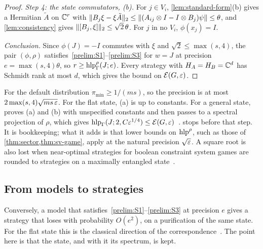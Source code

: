 \begin{proof}
\emph{Step 4: the state commutators, (b).} For $j\in V_i$, \cref{lem:standard-form}(b) gives a Hermitian $\tilde A$ on $\mathbb C^r$ with
$\lVert B_j\xi-\xi\tilde A\rVert_2\le\lVert (A_{ij}\otimes I-I\otimes B_j)\psi\rVert\le\theta$, and \cref{lem:consistency} gives
$\lVert [B_j,\xi]\rVert_2\le\sqrt2\,\theta$. For $j$ in no $V_i$, $\phi(x_j)=I$.

\emph{Conclusion.} Since $\phi(J)=-I$ commutes with $\xi$ and $\sqrt2\le\max(s,4)$, the pair $(\phi,\rho)$ satisfies~\ref{prelim:S1}--\ref{prelim:S3}
for $w=J$ at precision $e=\max(s,4)\theta$, so $r\ge\operatorname{hlp}^{\rho}_\Gamma(J;e)$. Every strategy with $H_A=H_B=\mathbb C^d$ has Schmidt rank at most $d$,
which gives the bound on $\mathcal E(G,\varepsilon)$.
\end{proof}

\begin{remark}[Credits]\label{transfer:credits}
For the default distribution $\pi_{\min}\ge1/(ms)$, so the precision is at most $2\max(s,4)\sqrt{ms\,\varepsilon}$. For the flat state, (a) is
\cite[Proposition~4.4(b)]{SV18} up to constants. For a general state, \cite[Proposition~5.4]{SV18} proves (a) and (b) with unspecified
constants and then passes to a spectral projection of $\rho$, which gives $\operatorname{hlp}_\Gamma(J;2,C\varepsilon^{1/4})\le\mathcal E(G,\varepsilon)$~\cite[Corollary~5.2]{SV18}.
 stops before that step. It is bookkeeping; what it adds is that lower bounds on $\operatorname{hlp}^{\rho}$, such as those of
\cref{thm:sector,thm:sv-game}, apply at the natural precision $\sqrt{\varepsilon}$. A square root is also lost when near-optimal strategies for
boolean constraint system games are rounded to strategies on a maximally entangled state~\cite[Corollary~1.3]{Pad22}.
\end{remark}

\subsection{From models to strategies}

Conversely, a model that satisfies~\ref{prelim:S1}--\ref{prelim:S3} at precision $e$ gives a strategy that loses with probability
$O(e^2)$, on a purification of the same state. For the flat state this is the classical direction of the
correspondence~\cite[Proposition~4.4(a)]{SV18}. The point here is that the state, and with it its spectrum, is kept.

